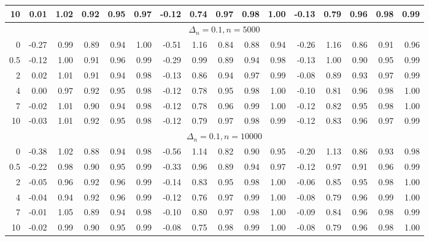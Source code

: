 \documentclass{article}
\theoremstyle{plain}
\theoremstyle{definition}
\theoremstyle{remark}
\begin{document}
\begin{appendix}
{\begin{table}[ht]
\begin{tabular}{r|rrrrr|rrrrr|rrrrr}
  10 & 0.01 & 1.02 & 0.92 & 0.95 & 0.97 & -0.12 & 0.74 & 0.97 & 0.98 & 1.00 & -0.13 & 0.79 & 0.96 & 0.98 & 0.99 \\ 
	\midrule
&\multicolumn{15}{c}{$\Delta_n=0.1, n= 5000$}
\\
  \hline
0 & -0.27 & 0.99 & 0.89 & 0.94 & 1.00 & -0.51 & 1.16 & 0.84 & 0.88 & 0.94 & -0.26 & 1.16 & 0.86 & 0.91 & 0.96 \\ 
  0.5 & -0.12 & 1.00 & 0.91 & 0.96 & 0.99 & -0.29 & 0.99 & 0.89 & 0.94 & 0.98 & -0.13 & 1.00 & 0.90 & 0.95 & 0.99 \\ 
  2 & 0.02 & 1.01 & 0.91 & 0.94 & 0.98 & -0.13 & 0.86 & 0.94 & 0.97 & 0.99 & -0.08 & 0.89 & 0.93 & 0.97 & 0.99 \\ 
  4 & 0.00 & 0.97 & 0.92 & 0.95 & 0.98 & -0.12 & 0.78 & 0.95 & 0.98 & 1.00 & -0.10 & 0.81 & 0.96 & 0.98 & 1.00 \\ 
  7 & -0.02 & 1.01 & 0.90 & 0.94 & 0.98 & -0.12 & 0.78 & 0.96 & 0.99 & 1.00 & -0.12 & 0.82 & 0.95 & 0.98 & 1.00 \\ 
  10 & -0.03 & 1.01 & 0.92 & 0.95 & 0.98 & -0.12 & 0.79 & 0.97 & 0.98 & 0.99 & -0.12 & 0.83 & 0.96 & 0.97 & 0.99 \\ 
		\midrule
	&\multicolumn{15}{c}{$\Delta_n=0.1, n= 10000$}
	\\
0 & -0.38 & 1.02 & 0.88 & 0.94 & 0.98 & -0.56 & 1.14 & 0.82 & 0.90 & 0.95 & -0.20 & 1.13 & 0.86 & 0.93 & 0.98 \\ 
  0.5 & -0.22 & 0.98 & 0.90 & 0.95 & 0.99 & -0.33 & 0.96 & 0.89 & 0.94 & 0.97 & -0.12 & 0.97 & 0.91 & 0.96 & 0.99 \\ 
  2 & -0.05 & 0.96 & 0.92 & 0.96 & 0.99 & -0.14 & 0.83 & 0.95 & 0.98 & 1.00 & -0.06 & 0.85 & 0.95 & 0.98 & 1.00 \\ 
  4 & -0.04 & 0.94 & 0.92 & 0.96 & 0.99 & -0.12 & 0.76 & 0.97 & 0.99 & 1.00 & -0.08 & 0.79 & 0.96 & 0.99 & 1.00 \\ 
  7 & -0.01 & 1.05 & 0.89 & 0.94 & 0.98 & -0.10 & 0.80 & 0.97 & 0.98 & 1.00 & -0.09 & 0.84 & 0.96 & 0.98 & 0.99 \\ 
  10 & -0.02 & 0.99 & 0.90 & 0.95 & 0.99 & -0.08 & 0.75 & 0.98 & 0.99 & 1.00 & -0.08 & 0.79 & 0.96 & 0.98 & 1.00 \\ 

\end{tabular}
\end{table}}
\end{appendix}
\end{document}
